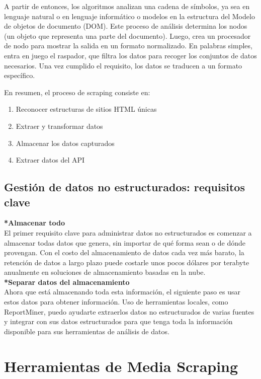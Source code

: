 \documentclass[twocolumn]{article}
\begin{document}
A partir de entonces, los algoritmos analizan una cadena de símbolos, ya sea en lenguaje natural o en lenguaje informático o modelos en la estructura del Modelo de objetos de documento (DOM). Este proceso de análisis determina los nodos (un objeto que representa una parte del documento). Luego, crea un procesador de nodo para mostrar la salida en un formato normalizado. En palabras simples, entra en juego el raspador, que filtra los datos para recoger los conjuntos de datos necesarios. Una vez cumplido el requisito, los datos se traducen a un formato específico.

En resumen, el proceso de scraping consiste en:

\begin{enumerate}
  \item Reconocer estructuras de sitios HTML únicas
  \item Extraer y transformar datos
  \item Almacenar los datos capturados
  \item Extraer datos del API
\end{enumerate}

\subsection{Gestión de datos no estructurados: requisitos clave}

\textbf{*Almacenar todo}\\El primer requisito clave para administrar datos no estructurados 
es comenzar a almacenar todas datos que genera, sin importar de qué forma sean o de 
dónde provengan. Con el costo del almacenamiento de datos cada vez más barato, 
la retención de datos a largo plazo puede costarle unos pocos dólares por terabyte 
anualmente en soluciones de almacenamiento basadas en la nube.\\
\textbf{*Separar datos del almacenamiento}\\
 Ahora que está almacenando toda esta información, 
el siguiente paso es usar estos datos para obtener información. Uso de herramientas 
locales, como ReportMiner, puedo ayudarte extraerlos datos no estructurados de varias 
fuentes y integrar con sus datos estructurados para que tenga toda la información disponible 
para sus herramientas de análisis de datos.\\

\section{Herramientas de Media Scraping}
\end{document}
